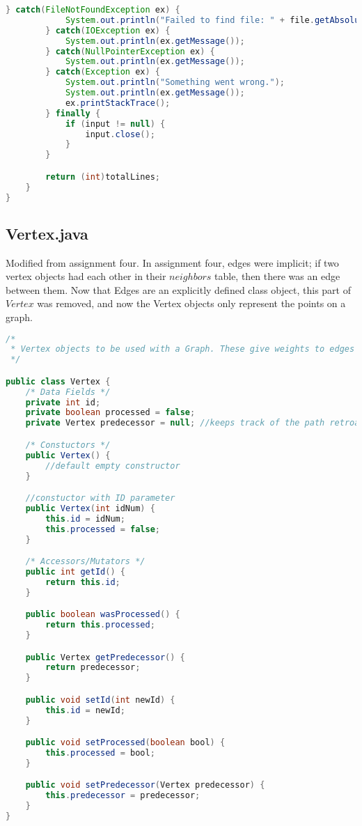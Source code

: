 \documentclass[letterpaper, 10pt,DIV=13]{scrartcl}
\numberwithin{equation}{section} %
\numberwithin{figure}{section} %
\numberwithin{table}{section} %
\begin{document}
\begin{lstlisting}[frame=single, language=java, breaklines]
        } catch(FileNotFoundException ex) {
            System.out.println("Failed to find file: " + file.getAbsolutePath());
        } catch(IOException ex) {
            System.out.println(ex.getMessage());
        } catch(NullPointerException ex) {
            System.out.println(ex.getMessage());
        } catch(Exception ex) {
            System.out.println("Something went wrong.");
            System.out.println(ex.getMessage());
            ex.printStackTrace();
        } finally {
            if (input != null) {
                input.close();
            }
        }

        return (int)totalLines;
    }
}
\end{lstlisting}
\pagebreak

\subsection{Vertex.java}
Modified from assignment four. In assignment four, edges were implicit; if two vertex objects had each other in their $neighbors$ table, then there was an edge between them. Now that Edges are an explicitly defined class object, this part of $Vertex$ was removed, and now the Vertex objects only represent the points on a graph.
\begin{lstlisting}[frame=single, language=java, breaklines]  
/*
 * Vertex objects to be used with a Graph. These give weights to edges in one direction, creating a directed graph.
 */

public class Vertex {
    /* Data Fields */
    private int id;
    private boolean processed = false;
    private Vertex predecessor = null; //keeps track of the path retroactively

    /* Constuctors */
    public Vertex() {
        //default empty constructor
    }

    //constuctor with ID parameter
    public Vertex(int idNum) {
        this.id = idNum;
        this.processed = false;
    }

    /* Accessors/Mutators */
    public int getId() {
        return this.id;
    }

    public boolean wasProcessed() {
        return this.processed;
    }

    public Vertex getPredecessor() {
        return predecessor;
    }

    public void setId(int newId) {
        this.id = newId;
    }

    public void setProcessed(boolean bool) {
        this.processed = bool;
    }

    public void setPredecessor(Vertex predecessor) {
        this.predecessor = predecessor;
    }
}
\end{lstlisting}
\end{document}
